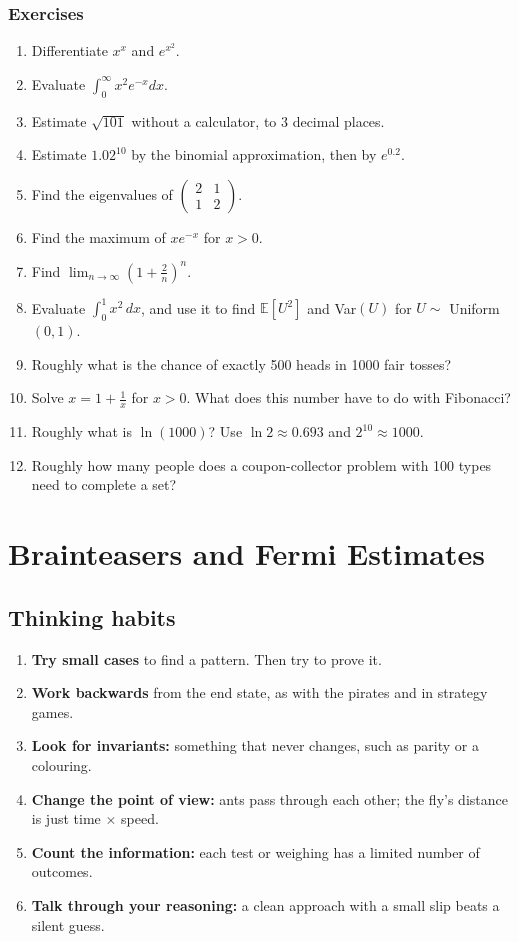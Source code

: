 \documentclass[11pt,a4paper,openany]{report}
\newenvironment{exercises}{\subsection*{Exercises \thechapter}\begin{enumerate}[label=\textbf{\thechapter.\arabic*},leftmargin=3.2em]}{\end{enumerate}}
\newcommand{\E}{\mathbb{E}}
\begin{document}
\begin{exercises}
\item Differentiate $x^x$ and $e^{x^2}$.
\item Evaluate $\int_0^\infty x^2e^{-x}dx$.
\item Estimate $\sqrt{101}$ without a calculator, to 3 decimal places.
\item Estimate $1.02^{10}$ by the binomial approximation, then by $e^{0.2}$.
\item Find the eigenvalues of $\begin{pmatrix}2&1\\1&2\end{pmatrix}$.
\item Find the maximum of $xe^{-x}$ for $x>0$.
\item Find $\lim_{n\to\infty}\left(1+\frac2n\right)^n$.
\item Evaluate $\int_0^1x^2\,dx$, and use it to find $\E[U^2]$ and Var$(U)$ for $U\sim$ Uniform$(0,1)$.
\item Roughly what is the chance of exactly 500 heads in 1000 fair tosses?
\item Solve $x=1+\frac1x$ for $x>0$. What does this number have to do with Fibonacci?
\item Roughly what is $\ln(1000)$? Use $\ln2\approx0.693$ and $2^{10}\approx1000$.
\item Roughly how many people does a coupon-collector problem with 100 types need to complete a set?
\end{exercises}

\chapter{Brainteasers and Fermi Estimates}\label{ch:brain}

\section{Thinking habits}
\begin{idea}
\begin{enumerate}[nosep]
\item \textbf{Try small cases} to find a pattern. Then try to prove it.
\item \textbf{Work backwards} from the end state, as with the pirates and in strategy games.
\item \textbf{Look for invariants:} something that never changes, such as parity or a colouring.
\item \textbf{Change the point of view:} ants pass through each other; the fly's distance is just time $\times$ speed.
\item \textbf{Count the information:} each test or weighing has a limited number of outcomes.
\item \textbf{Talk through your reasoning:} a clean approach with a small slip beats a silent guess.
\end{enumerate}
\end{idea}
\end{document}
